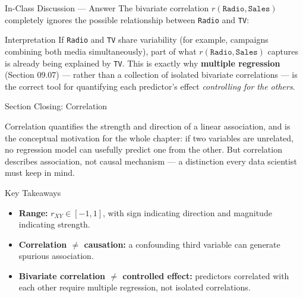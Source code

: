 \documentclass[10pt, aspectratio=169]{beamer}
\begin{document}
\begin{frame}{In-Class Discussion --- Answer}
  \scriptsize
  The bivariate correlation $r(\texttt{Radio},\texttt{Sales})$ completely ignores the possible relationship between \texttt{Radio} and \texttt{TV}: \pause

  \vspace{0.1cm}
  \begin{alertblock}{Interpretation}
    If \texttt{Radio} and \texttt{TV} share variability (for example, campaigns combining both media simultaneously), part of what $r(\texttt{Radio},\texttt{Sales})$ captures is already being explained by \texttt{TV}. This is exactly why \textbf{multiple regression} (Section 09.07) --- rather than a collection of isolated bivariate correlations --- is the correct tool for quantifying each predictor's effect \emph{controlling for the others}.
  \end{alertblock}
\end{frame}

\begin{frame}{Section Closing: Correlation}
  \begin{reflexion}
    Correlation quantifies the strength and direction of a linear association, and is the conceptual motivation for the whole chapter: if two variables are unrelated, no regression model can usefully predict one from the other. But correlation describes association, not causal mechanism --- a distinction every data scientist must keep in mind.
  \end{reflexion}

  \vspace{0.2cm}
  \pause
  \begin{block}{Key Takeaways}
    \begin{itemize}\itemsep=0.08cm
      \item \textbf{Range:} $r_{XY}\in[-1,1]$, with sign indicating direction and magnitude indicating strength.
      \item \textbf{Correlation $\neq$ causation:} a confounding third variable can generate spurious association.
      \item \textbf{Bivariate correlation $\neq$ controlled effect:} predictors correlated with each other require multiple regression, not isolated correlations.
    \end{itemize}
  \end{block}
\end{frame}
\end{document}
